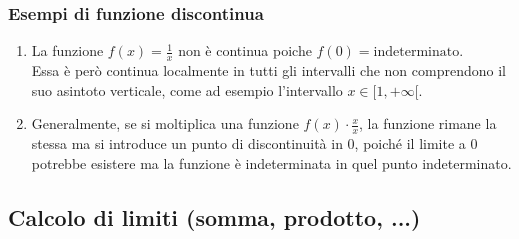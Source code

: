 \documentclass{article}
\begin{document}
\subsubsection{Esempi di funzione discontinua}
\begin{enumerate}
    \item La funzione \(f(x)=\frac{1}{x}\) non è continua poiche \(f(0)=\text{indeterminato}\).\\
        Essa è però continua localmente in tutti gli intervalli che non comprendono il suo
        asintoto verticale, come ad esempio l'intervallo \(x \in [1, +\infty[\).
    \item Generalmente, se si moltiplica una funzione \(f(x) \cdot \frac{x}{x}\), la funzione
        rimane la stessa ma si introduce un punto di discontinuità in 0, poiché il limite
        a 0 potrebbe esistere ma la funzione è indeterminata in quel punto indeterminato.
\end{enumerate}

\newpage
\subsection{Calcolo di limiti (somma, prodotto, ...)}
\end{document}
